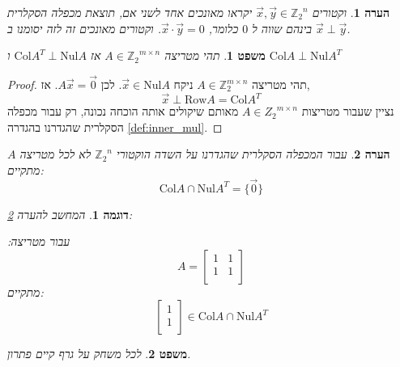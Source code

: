 \documentclass[12pt,leqno]{article}
\theoremstyle{theoremdd}
\newtheorem{theorem}{משפט}[section]
\newtheorem{example}{דוגמה}[section]
\newtheorem{comm}{הערה}[section]
\newcommand{\Zn}{{\mathbb{Z}_2}^n}
\newcommand{\Col}{\mathrm{Col}}
\newcommand{\Nul}{\mathrm{Nul}}
\begin{document}
\begin{comm}
    וקטורים 
    $\vec x, \vec y \in \Zn $
    יקראו מאונכים אחד לשני
    אם,
    תוצאת מכפלה הסקלרית בינהם שווה
    ל
    $0$
    כלומר,
    $\vec{x} \cdot \vec{y} = 0$.
    וקטורים מאונכים זה לזה יסומנו ב
    $\vec x \perp \vec y$.
\end{comm}
\begin{theorem}
    \label{the: Nul A and Col AT}
    תהי מטריצה 
    $A \in {\mathbb{Z}_2}^{m \times n }$
    אז 
    $\Col A^T \perp \Nul A$
    ו
    $\Col A \perp \Nul A^T$
\end{theorem}
\begin{proof}
    תהי 
    מטריצה
    $A \in \mathbb{Z}_2^{m \times n}$
    ניקח 
    $\vec x \in \mathrm{Nul} A$.
    לכן
    $A\vec x=\vec 0$. 
    אז,
    \[
        \vec x \perp \mathrm{Row}A=\mathrm{Col} A^T
    \]
    נציין 
    שעבור 
    מטריצות 
    $A \in {Z_2}^{m \times n}$
    מאותם שיקולים אותה הוכחה נכונה,
    רק עבור מכפלה הסקלרית שהגדרנו 
    בהגדרה 
    \ref{def:inner_mul}.
\end{proof}
\begin{comm}
    \label{comm:not-all-A-ColA-intersection-NulA-empty}
    עבור 
    המכפלה הסקלרית שהגדרנו
    על השדה הוקטורי 
    $\Zn$
    לא לכל מטריצה 
    $A$
    מתקיים:
    \[\Col A \cap \Nul A^T = \{ \vec{0}\}\]
\end{comm}
\begin{example}
    המחשב להערה 
    \ref{comm:not-all-A-ColA-intersection-NulA-empty}:
    
    עבור מטריצה:
    \[A = 
    \begin{bmatrix}
        1 & 1 \\
        1 & 1 \\
    \end{bmatrix}\]
    מתקיים:
    \[
    \begin{bmatrix}
        1 \\
        1 \\
    \end{bmatrix}
    \in \Col A \cap \Nul A^T \]
\end{example}
\begin{theorem}
    \label{thrm: clean game has solution}
    לכל משחק על גרף קיים פתרון.
\end{theorem}
\end{document}
